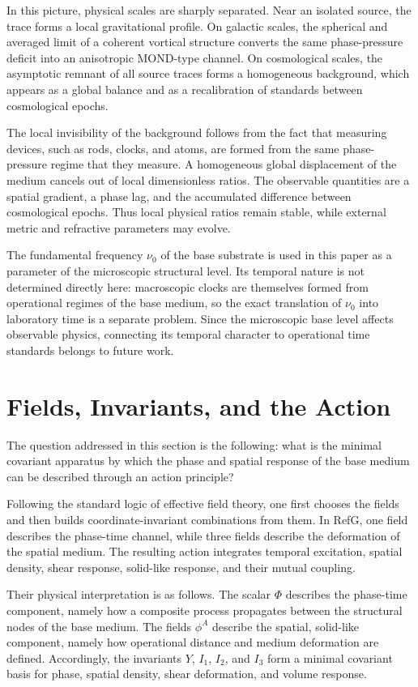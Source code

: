 \documentclass[12pt]{article}
\begin{document}
In this picture, physical scales are sharply separated. Near an isolated source, the trace forms a local gravitational profile. On galactic scales, the spherical and averaged limit of a coherent vortical structure converts the same phase-pressure deficit into an anisotropic MOND-type channel. On cosmological scales, the asymptotic remnant of all source traces forms a homogeneous background, which appears as a global balance and as a recalibration of standards between cosmological epochs.

The local invisibility of the background follows from the fact that measuring devices, such as rods, clocks, and atoms, are formed from the same phase-pressure regime that they measure. A homogeneous global displacement of the medium cancels out of local dimensionless ratios. The observable quantities are a spatial gradient, a phase lag, and the accumulated difference between cosmological epochs. Thus local physical ratios remain stable, while external metric and refractive parameters may evolve.

The fundamental frequency $\nu_0$ of the base substrate is used in this paper as a parameter of the microscopic structural level. Its temporal nature is not determined directly here: macroscopic clocks are themselves formed from operational regimes of the base medium, so the exact translation of $\nu_0$ into laboratory time is a separate problem. Since the microscopic base level affects observable physics, connecting its temporal character to operational time standards belongs to future work.

\section{Fields, Invariants, and the Action}

The question addressed in this section is the following: what is the minimal covariant apparatus by which the phase and spatial response of the base medium can be described through an action principle?

Following the standard logic of effective field theory, one first chooses the fields and then builds coordinate-invariant combinations from them. In RefG, one field describes the phase-time channel, while three fields describe the deformation of the spatial medium. The resulting action integrates temporal excitation, spatial density, shear response, solid-like response, and their mutual coupling.

Their physical interpretation is as follows. The scalar $\Phi$ describes the phase-time component, namely how a composite process propagates between the structural nodes of the base medium. The fields $\phi^A$ describe the spatial, solid-like component, namely how operational distance and medium deformation are defined. Accordingly, the invariants $Y$, $I_1$, $I_2$, and $I_3$ form a minimal covariant basis for phase, spatial density, shear deformation, and volume response.
\end{document}
